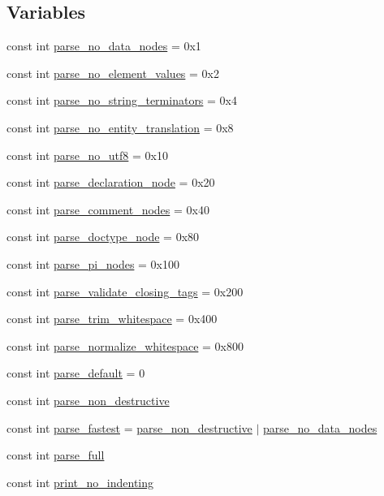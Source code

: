 \subsection*{Variables}
\begin{DoxyCompactItemize}
\item 
const int \mbox{\hyperlink{namespacerapidxml_ac2d21ef14a4e8936b94aca5d38b1a74d}{parse\+\_\+no\+\_\+data\+\_\+nodes}} = 0x1
\item 
const int \mbox{\hyperlink{namespacerapidxml_a00e6fea134b786ea6efeed1c8bc4a668}{parse\+\_\+no\+\_\+element\+\_\+values}} = 0x2
\item 
const int \mbox{\hyperlink{namespacerapidxml_af3fc88ba6bee33482a2db81b1da36ea1}{parse\+\_\+no\+\_\+string\+\_\+terminators}} = 0x4
\item 
const int \mbox{\hyperlink{namespacerapidxml_a89113c103ffaf77615d1aa330c8dcca8}{parse\+\_\+no\+\_\+entity\+\_\+translation}} = 0x8
\item 
const int \mbox{\hyperlink{namespacerapidxml_a22d4aefaceb00d7afabfef7107b108da}{parse\+\_\+no\+\_\+utf8}} = 0x10
\item 
const int \mbox{\hyperlink{namespacerapidxml_a999d782659513f8015ea4236e3204c42}{parse\+\_\+declaration\+\_\+node}} = 0x20
\item 
const int \mbox{\hyperlink{namespacerapidxml_ae093dd49e2f59fa39eee95f1a6568e32}{parse\+\_\+comment\+\_\+nodes}} = 0x40
\item 
const int \mbox{\hyperlink{namespacerapidxml_a41002b49780a90a0bbcc28ce8b895fe4}{parse\+\_\+doctype\+\_\+node}} = 0x80
\item 
const int \mbox{\hyperlink{namespacerapidxml_a03fe68fcf5d28f38476e0fd31adecc4c}{parse\+\_\+pi\+\_\+nodes}} = 0x100
\item 
const int \mbox{\hyperlink{namespacerapidxml_a7ce8f40fda68338e20b56f41e48e49f3}{parse\+\_\+validate\+\_\+closing\+\_\+tags}} = 0x200
\item 
const int \mbox{\hyperlink{namespacerapidxml_a61912424b47db5038e726d4e1c22417f}{parse\+\_\+trim\+\_\+whitespace}} = 0x400
\item 
const int \mbox{\hyperlink{namespacerapidxml_a31f33885defb5176a7d99e524c35d386}{parse\+\_\+normalize\+\_\+whitespace}} = 0x800
\item 
const int \mbox{\hyperlink{namespacerapidxml_acf4edf952f59eb1b6124ea37ad7da3ab}{parse\+\_\+default}} = 0
\item 
const int \mbox{\hyperlink{namespacerapidxml_a45d4d8fef551beaaba23a83b847fd6a3}{parse\+\_\+non\+\_\+destructive}}
\item 
const int \mbox{\hyperlink{namespacerapidxml_a64da06dfdab7c86ca954bda4fecb978f}{parse\+\_\+fastest}} = \mbox{\hyperlink{namespacerapidxml_a45d4d8fef551beaaba23a83b847fd6a3}{parse\+\_\+non\+\_\+destructive}} $\vert$ \mbox{\hyperlink{namespacerapidxml_ac2d21ef14a4e8936b94aca5d38b1a74d}{parse\+\_\+no\+\_\+data\+\_\+nodes}}
\item 
const int \mbox{\hyperlink{namespacerapidxml_abb48dc65db75d9e49734bc5bd2fabbfc}{parse\+\_\+full}}
\item 
const int \mbox{\hyperlink{namespacerapidxml_a65477b812a80f5bda693ec57e57de064}{print\+\_\+no\+\_\+indenting}}
\end{DoxyCompactItemize}


